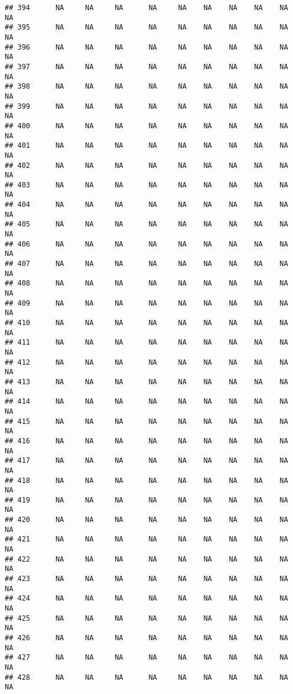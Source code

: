 \documentclass{article}\usepackage{graphicx, color}
\makeatletter
\newenvironment{kframe}{%
 \def\at@end@of@kframe{}%
 \ifinner\ifhmode%
  \def\at@end@of@kframe{\end{minipage}}%
  \begin{minipage}{\columnwidth}%
 \fi\fi%
 \def\FrameCommand##1{\hskip\@totalleftmargin \hskip-\fboxsep
 \colorbox{shadecolor}{##1}\hskip-\fboxsep
     \hskip-\linewidth \hskip-\@totalleftmargin \hskip\columnwidth}%
 \MakeFramed {\advance\hsize-\width
   \@totalleftmargin\z@ \linewidth\hsize
   \@setminipage}}%
 {\par\unskip\endMakeFramed%
 \at@end@of@kframe}
\newenvironment{knitrout}{}{} %
\makeatother
\begin{document}
\begin{knitrout}
\begin{kframe}
\begin{verbatim}
## 394      NA     NA     NA      NA     NA    NA    NA    NA    NA     NA
## 395      NA     NA     NA      NA     NA    NA    NA    NA    NA     NA
## 396      NA     NA     NA      NA     NA    NA    NA    NA    NA     NA
## 397      NA     NA     NA      NA     NA    NA    NA    NA    NA     NA
## 398      NA     NA     NA      NA     NA    NA    NA    NA    NA     NA
## 399      NA     NA     NA      NA     NA    NA    NA    NA    NA     NA
## 400      NA     NA     NA      NA     NA    NA    NA    NA    NA     NA
## 401      NA     NA     NA      NA     NA    NA    NA    NA    NA     NA
## 402      NA     NA     NA      NA     NA    NA    NA    NA    NA     NA
## 403      NA     NA     NA      NA     NA    NA    NA    NA    NA     NA
## 404      NA     NA     NA      NA     NA    NA    NA    NA    NA     NA
## 405      NA     NA     NA      NA     NA    NA    NA    NA    NA     NA
## 406      NA     NA     NA      NA     NA    NA    NA    NA    NA     NA
## 407      NA     NA     NA      NA     NA    NA    NA    NA    NA     NA
## 408      NA     NA     NA      NA     NA    NA    NA    NA    NA     NA
## 409      NA     NA     NA      NA     NA    NA    NA    NA    NA     NA
## 410      NA     NA     NA      NA     NA    NA    NA    NA    NA     NA
## 411      NA     NA     NA      NA     NA    NA    NA    NA    NA     NA
## 412      NA     NA     NA      NA     NA    NA    NA    NA    NA     NA
## 413      NA     NA     NA      NA     NA    NA    NA    NA    NA     NA
## 414      NA     NA     NA      NA     NA    NA    NA    NA    NA     NA
## 415      NA     NA     NA      NA     NA    NA    NA    NA    NA     NA
## 416      NA     NA     NA      NA     NA    NA    NA    NA    NA     NA
## 417      NA     NA     NA      NA     NA    NA    NA    NA    NA     NA
## 418      NA     NA     NA      NA     NA    NA    NA    NA    NA     NA
## 419      NA     NA     NA      NA     NA    NA    NA    NA    NA     NA
## 420      NA     NA     NA      NA     NA    NA    NA    NA    NA     NA
## 421      NA     NA     NA      NA     NA    NA    NA    NA    NA     NA
## 422      NA     NA     NA      NA     NA    NA    NA    NA    NA     NA
## 423      NA     NA     NA      NA     NA    NA    NA    NA    NA     NA
## 424      NA     NA     NA      NA     NA    NA    NA    NA    NA     NA
## 425      NA     NA     NA      NA     NA    NA    NA    NA    NA     NA
## 426      NA     NA     NA      NA     NA    NA    NA    NA    NA     NA
## 427      NA     NA     NA      NA     NA    NA    NA    NA    NA     NA
## 428      NA     NA     NA      NA     NA    NA    NA    NA    NA     NA

\end{verbatim}
\end{kframe}
\end{knitrout}
\end{document}
